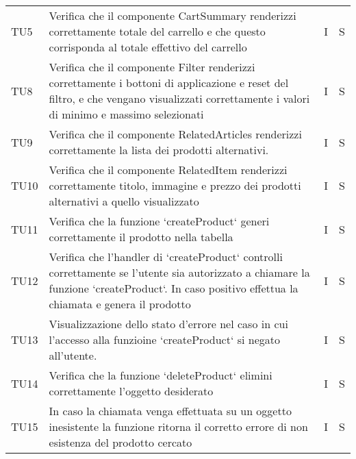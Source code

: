 \begin{center}
\begin{longtable}[!h]{p{45px} p{255px} p{35px} p{35px}}
        TU5           & Verifica che il componente CartSummary renderizzi correttamente totale del carrello \newline e che questo corrisponda al totale effettivo del carrello                                           & I              & S              \\
        TU8           & Verifica che il componente Filter renderizzi correttamente i bottoni di applicazione e reset del filtro, e che vengano visualizzati correttamente i valori di minimo e massimo selezionati       & I              & S              \\
        TU9           & Verifica che il componente RelatedArticles renderizzi correttamente la lista dei prodotti alternativi.                                                                                           & I              & S              \\
        TU10          & Verifica che il componente RelatedItem renderizzi correttamente titolo, immagine e prezzo dei prodotti alternativi a quello visualizzato                                                         & I              & S              \\
        TU11          & Verifica che la funzione `createProduct` generi correttamente il prodotto nella tabella                                                                                                          & I              & S              \\
        TU12          & Verifica che l'handler di `createProduct` controlli correttamente se l'utente sia autorizzato a chiamare la funzione `createProduct`. In caso positivo effettua la chiamata e genera il prodotto & I              & S              \\
        TU13          & Visualizzazione dello stato d'errore nel caso in cui l'accesso alla funzioine `createProduct` si negato all'utente.                                                                              & I              & S              \\
        TU14          & Verifica che la funzione `deleteProduct` elimini correttamente l'oggetto desiderato                                                                                                              & I              & S              \\
        TU15          & In caso la chiamata venga effettuata su un oggetto inesistente la funzione ritorna il corretto errore di non esistenza del prodotto cercato                                                      & I              & S              \\

\end{longtable}
\end{center}
